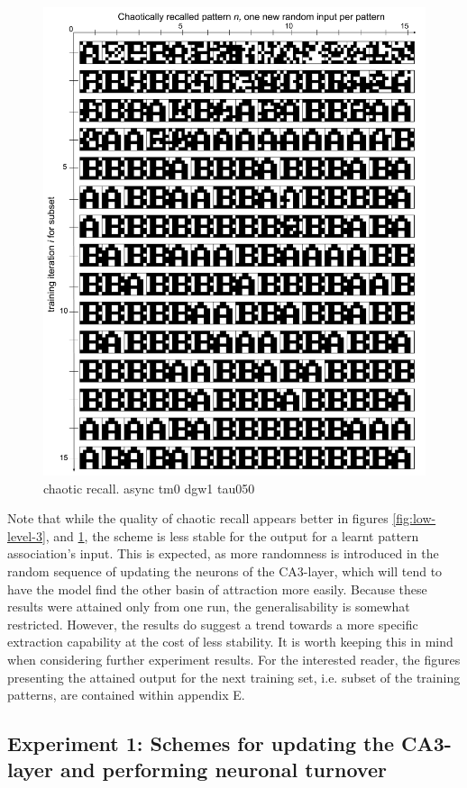 \begin{figure}
    \centering
    \includegraphics[width=12cm]{fig/AB-chaotic-recall-async-tm0-dgw1-tau050}
    \caption{chaotic recall. async tm0 dgw1 tau050}
    \label{fig:low-level-4}
\end{figure}

Note that while the quality of chaotic recall appears better in figures \ref{fig:low-level-3}, and \ref{fig:low-level-4}, the scheme is less stable for the output for a learnt pattern association's input. This is expected, as more randomness is introduced in the random sequence of updating the neurons of the CA3-layer, which will tend to have the model find the other basin of attraction more easily. Because these results were attained only from one run, the generalisability is somewhat restricted. However, the results do suggest a trend towards a more specific extraction capability at the cost of less stability. It is worth keeping this in mind when considering further experiment results. For the interested reader, the figures presenting the attained output for the next training set, i.e. subset of the training patterns, are contained within appendix E.


\subsection{Experiment 1: Schemes for updating the CA3-layer and performing neuronal turnover}

